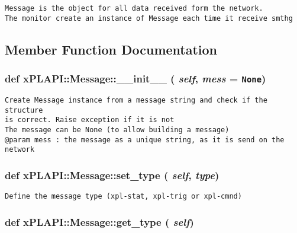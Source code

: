\footnotesize\begin{verbatim}
Message is the object for all data received form the network.
The monitor create an instance of Message each time it receive smthg
\end{verbatim}
\normalsize
 

\subsection{Member Function Documentation}
\hypertarget{classxPLAPI_1_1Message_f1efb1186af373f1ce3d107be47e3f3f}{
\subsubsection[\_\-\_\-init\_\-\_\-]{\setlength{\rightskip}{0pt plus 5cm}def xPLAPI::Message::\_\-\_\-init\_\-\_\- ( {\em self}, \/   {\em mess} = {\tt None})}}
\label{classxPLAPI_1_1Message_f1efb1186af373f1ce3d107be47e3f3f}




\footnotesize\begin{verbatim}
Create Message instance from a message string and check if the structure 
is correct. Raise exception if it is not
The message can be None (to allow building a message)
@param mess : the message as a unique string, as it is send on the network
\end{verbatim}
\normalsize
 \hypertarget{classxPLAPI_1_1Message_a24b962cfffbd90f1cb79a2c20e581e6}{
\subsubsection[set\_\-type]{\setlength{\rightskip}{0pt plus 5cm}def xPLAPI::Message::set\_\-type ( {\em self}, \/   {\em type})}}
\label{classxPLAPI_1_1Message_a24b962cfffbd90f1cb79a2c20e581e6}




\footnotesize\begin{verbatim}
Define the message type (xpl-stat, xpl-trig or xpl-cmnd)
\end{verbatim}
\normalsize
 \hypertarget{classxPLAPI_1_1Message_55aad8c9b685e349f7e3d3f58b6ff5aa}{
\subsubsection[get\_\-type]{\setlength{\rightskip}{0pt plus 5cm}def xPLAPI::Message::get\_\-type ( {\em self})}}
\label{classxPLAPI_1_1Message_55aad8c9b685e349f7e3d3f58b6ff5aa}




